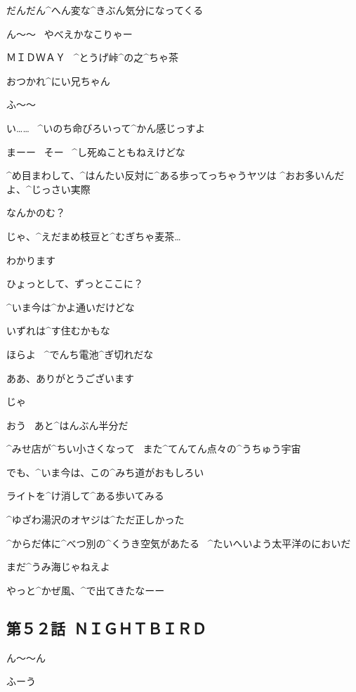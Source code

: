 \Ayase だんだん^{へん}{変}な^{きぶん}{気分}になってくる

\Ayase ん〜〜
\ やべえかなこりゃー

\page[115]
\Sign ＭＩＤＷＡＹ
\ ^{とうげ}{峠}^{の}{之}^{ちゃ}{茶}

\Person おつかれ^{にい}{兄}ちゃん

\Ayase ふ〜〜

\Ayase い……
\ ^{いのち}{命}びろいって^{かん}{感}じっすよ

\Person まーー
\ そー
\ ^{し}{死}ぬこともねえけどな

\Person ^{め}{目}まわして、^{はんたい}{反対}に^{ある}{歩}ってっちゃうヤツは
^{おお}{多}いんだよ、^{じっさい}{実際}

\Person なんかのむ？

\Ayase じゃ、^{えだまめ}{枝豆}と^{むぎちゃ}{麦茶}…

\Ayase わかります

\page
\Ayase ひょっとして、ずっとここに？

\Person ^{いま}{今}は^{かよ}{通}いだけどな

\Person いずれは^{す}{住}むかもな

\Person ほらよ
\ ^{でんち}{電池}^{ぎ}{切}れだな

\Ayase ああ、ありがとうございます

\page
\Ayase じゃ

\Person おう
\ あと^{はんぶん}{半分}だ

\Ayase ^{みせ}{店}が^{ちい}{小}さくなって
\ また^{てんてん}{点々}の^{うちゅう}{宇宙}

\Ayase でも、^{いま}{今}は、この^{みち}{道}がおもしろい

\Ayase ライトを^{け}{消}して^{ある}{歩}いてみる

\Ayase ^{ゆざわ}{湯沢}のオヤジは^{ただ}{正}しかった

\page[119]
\Ayase ^{からだ}{体}に^{べつ}{別}の^{くうき}{空気}があたる
\ ^{たいへいよう}{太平洋}のにおいだ

\Ayase まだ^{うみ}{海}じゃねえよ

\page
\Alpha やっと^{かぜ}{風}、^{で}{出}てきたなーー


\subsection{第５２話\ ＮＩＧＨＴＢＩＲＤ}

\page[122]
\Alpha ん〜〜ん

\Alpha ふーう

